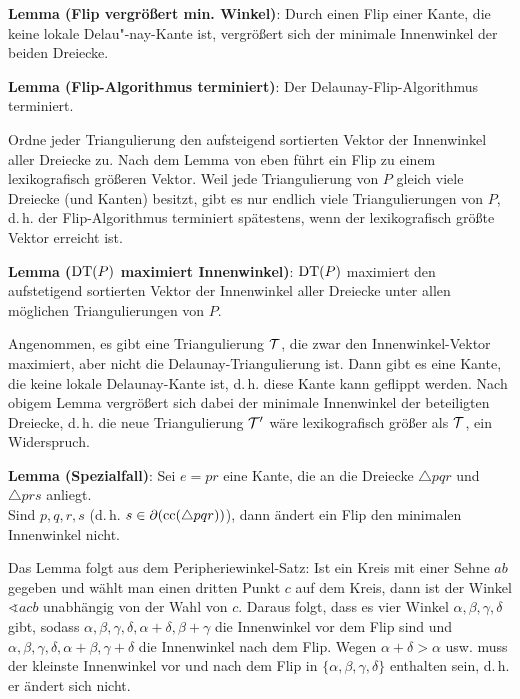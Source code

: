 \linie

\textbf{Lemma (Flip vergrößert min. Winkel)}:
Durch einen Flip einer Kante, die keine lokale Delau"-nay-Kante ist,
vergrößert sich der minimale Innenwinkel der beiden Dreiecke.

\textbf{Lemma (Flip-Algorithmus terminiert)}:
Der Delaunay-Flip-Algorithmus terminiert.

\begin{Beweis}
    Ordne jeder Triangulierung den aufsteigend sortierten Vektor der Innenwinkel aller Dreiecke zu.
    Nach dem Lemma von eben führt ein Flip zu einem lexikografisch größeren Vektor.
    Weil jede Triangulierung von $P$ gleich viele Dreiecke (und Kanten) besitzt,
    gibt es nur endlich viele Triangulierungen von $P$, d.\,h.
    der Flip-Algorithmus terminiert spätestens, wenn der lexikografisch größte Vektor
    erreicht ist.
\end{Beweis}

\textbf{Lemma ($\operatorname{DT}(P)$ maximiert Innenwinkel)}:
$\operatorname{DT}(P)$ maximiert den aufstetigend sortierten Vektor der Innenwinkel aller
Dreiecke unter allen möglichen Triangulierungen von $P$.

\begin{Beweis}
    Angenommen, es gibt eine Triangulierung $\mathcal{T}$, die zwar den Innenwinkel-Vektor maximiert,
    aber nicht die Delaunay-Triangulierung ist.
    Dann gibt es eine Kante, die keine lokale Delaunay-Kante ist, d.\,h.
    diese Kante kann geflippt werden.
    Nach obigem Lemma vergrößert sich dabei der minimale Innenwinkel der beteiligten Dreiecke,
    d.\,h. die neue Triangulierung $\mathcal{T}'$ wäre lexikografisch größer als $\mathcal{T}$, ein Widerspruch.
\end{Beweis}

\textbf{Lemma (Spezialfall)}:
Sei $e = pr$ eine Kante, die an die Dreiecke $\triangle pqr$ und $\triangle prs$ anliegt.\\
Sind $p, q, r, s$  (d.\,h. $s \in \partial(\operatorname{cc}(\triangle pqr))$),
dann ändert ein Flip den minimalen Innenwinkel nicht.

\begin{Beweis}
    Das Lemma folgt aus dem Peripheriewinkel-Satz:
    Ist ein Kreis mit einer Sehne $ab$ gegeben und wählt man einen dritten Punkt $c$ auf dem Kreis,
    dann ist der Winkel $\sphericalangle acb$ unabhängig von der Wahl von $c$.
    Daraus folgt, dass es vier Winkel $\alpha, \beta, \gamma, \delta$ gibt,
    sodass $\alpha, \beta, \gamma, \delta, \alpha + \delta, \beta + \gamma$
    die Innenwinkel vor dem Flip sind und
    $\alpha, \beta, \gamma, \delta, \alpha + \beta, \gamma + \delta$
    die Innenwinkel nach dem Flip.
    Wegen $\alpha + \delta > \alpha$ usw.
    muss der kleinste Innenwinkel vor und nach dem Flip in $\{\alpha, \beta, \gamma, \delta\}$
    enthalten sein, d.\,h. er ändert sich nicht.
\end{Beweis}

